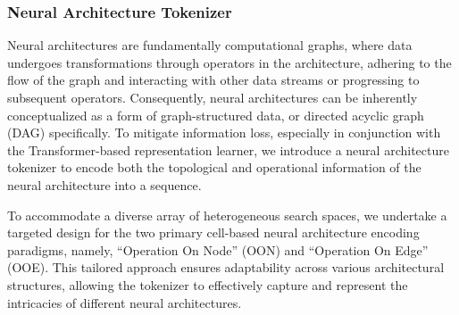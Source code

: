 \documentclass[../main.tex]{subfiles}
\begin{document}
\subsubsection{Neural Architecture Tokenizer}

Neural architectures are fundamentally computational graphs, where data undergoes transformations through operators in the architecture, adhering to the flow of the graph and interacting with other data streams or progressing to subsequent operators.
Consequently, neural architectures can be inherently conceptualized as a form of graph-structured data, or directed acyclic graph (DAG) specifically.
To mitigate information loss, especially in conjunction with the Transformer-based representation learner, we introduce a neural architecture tokenizer to encode both the topological and operational information of the neural architecture into a sequence.

To accommodate a diverse array of heterogeneous search spaces, we undertake a targeted design for the two primary cell-based neural architecture encoding paradigms, namely, ``Operation On Node'' (OON) and ``Operation On Edge'' (OOE).
This tailored approach ensures adaptability across various architectural structures, allowing the tokenizer to effectively capture and represent the intricacies of different neural architectures.
\end{document}
